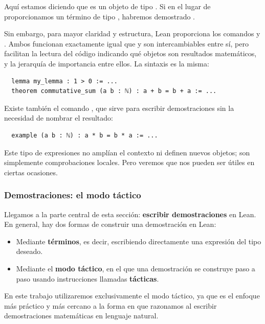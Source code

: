 Aquí estamos diciendo que  es un objeto de tipo . Si en el lugar de  proporcionamos un término de tipo , habremos demostrado .

Sin embargo, para mayor claridad y estructura, Lean proporciona los comandos  y . Ambos funcionan exactamente igual que  y son intercambiables entre sí, pero facilitan la lectura del código indicando qué objetos son resultados matemáticos, y la jerarquía de importancia entre ellos. La sintaxis es la misma:

\begin{lstlisting}
  lemma my_lemma : 1 > 0 := ...
  theorem commutative_sum (a b : ℕ) : a + b = b + a := ...
\end{lstlisting}

Existe también el comando , que sirve para escribir demostraciones sin la necesidad de nombrar el resultado:

\begin{lstlisting}
  example (a b : ℕ) : a * b = b * a := ...
\end{lstlisting}

Este tipo de expresiones no amplían el contexto ni definen nuevos objetos; son simplemente comprobaciones locales. Pero veremos que nos pueden ser útiles en ciertas ocasiones.


\subsubsection{Demostraciones: el modo táctico}

Llegamos a la parte central de esta sección: \textbf{escribir demostraciones} en Lean. En general, hay dos formas de construir una demostración en Lean:

\begin{itemize}
  \item Mediante \textbf{términos}, es decir, escribiendo directamente una expresión del tipo deseado.
  \item Mediante el \textbf{modo táctico}, en el que una demostración se construye paso a paso usando instrucciones llamadas \textbf{tácticas}.
\end{itemize}

En este trabajo utilizaremos exclusivamente el modo táctico, ya que es el enfoque más práctico y más cercano a la forma en que razonamos al escribir demostraciones matemáticas en lenguaje natural. 

